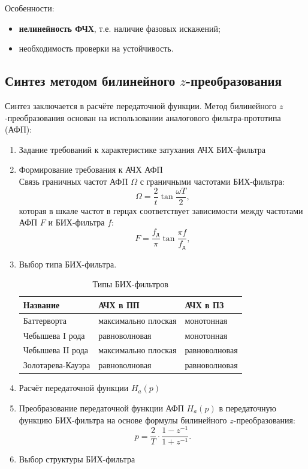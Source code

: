 \documentclass[a4paper, 14pt]{extarticle}
\begin{document}
Особенности:
\begin{itemize}
    \item \textbf{нелинейность ФЧХ}, т.е. наличие фазовых искажений;
    \item необходимость проверки на устойчивость.
\end{itemize}

\subsection{Синтез методом билинейного $z$-преобразования}
Синтез заключается в расчёте передаточной функции. Метод билинейного $z$-преобразования основан на использовании аналогового фильтра-прототипа (АФП):
\begin{enumerate}
    \item Задание требований к характеристике затухания АЧХ БИХ-фильтра
    \item Формирование требования к АЧХ АФП\\
        Связь граничных частот АФП $\Omega$ с граничными частотами БИХ-фильтра:
        \begin{equation}
            \Omega = \frac{2}{t} \tan \frac{\omega T}{2},
        \end{equation}
        которая в шкале частот в герцах соответствует зависимости между частотами АФП $F$ и БИХ-фильтра $f$:
        \begin{equation}
            F = \frac{f_\text{д}}{\pi} \tan \frac{\pi f}{f_\text{д}},
        \end{equation}
    \item Выбор типа БИХ-фильтра.\\
    \begin{table}[h]
    \centering
    \caption{Типы БИХ-фильтров}
    \begin{tabular}{@{}lll@{}}
    \toprule
    \textbf{Название} & \textbf{АЧХ в ПП}   & \textbf{АЧХ в ПЗ} \\ \midrule
    Баттерворта       & максимально плоская & монотонная        \\
    Чебышева I рода   & равноволновая       & монотонная        \\
    Чебышева II рода  & максимально плоская & равноволновая     \\
    Золотарева-Кауэра & равноволновая       & равноволновая     \\ \bottomrule
    \end{tabular}
    \end{table}
    \item Расчёт передаточной функции $H_a(p)$
    \item Преобразование передаточной функции АФП $H_a(p)$ в передаточную функцию БИХ-фильтра на основе формулы билинейного $z$-преобразования:
        \begin{equation}
            p = \frac{2}{T} \cdot \frac{1 - z^{-1}}{1 + z^{-1}}.
        \end{equation}
    \item Выбор структуры БИХ-фильтра
\end{enumerate}
\end{document}
